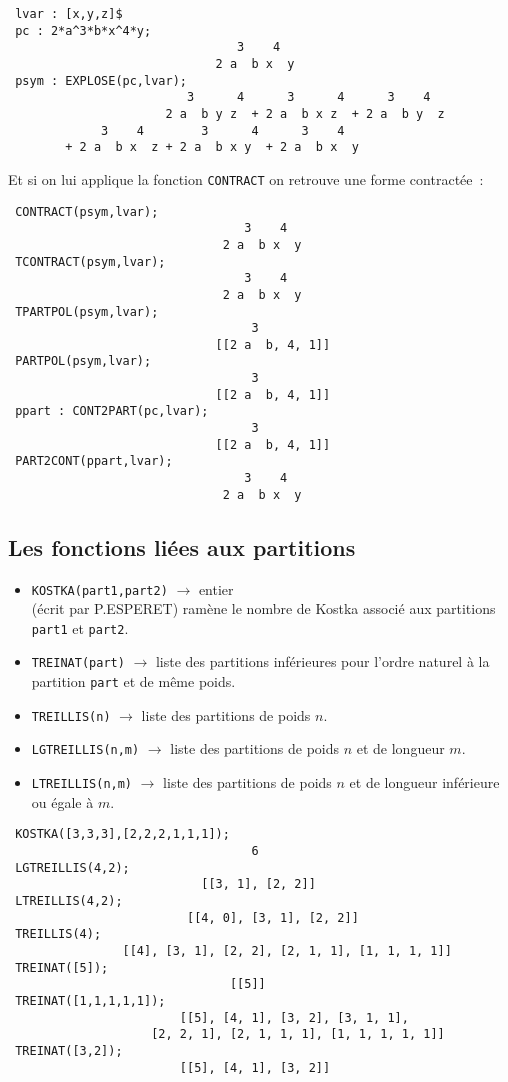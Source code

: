\small
\begin{verbatim}
 lvar : [x,y,z]$
 pc : 2*a^3*b*x^4*y;  
                                3    4
                             2 a  b x  y
 psym : EXPLOSE(pc,lvar);
                         3      4      3      4      3    4   
                      2 a  b y z  + 2 a  b x z  + 2 a  b y  z 
             3    4        3      4      3    4
        + 2 a  b x  z + 2 a  b x y  + 2 a  b x  y
\end{verbatim}
\normalsize
Et si on lui applique la fonction {\tt CONTRACT} on retrouve une forme 
contract\'ee~:
\small
\begin{verbatim}
 CONTRACT(psym,lvar);
                                 3    4
                              2 a  b x  y
 TCONTRACT(psym,lvar);
                                 3    4
                              2 a  b x  y
 TPARTPOL(psym,lvar);
                                  3
                             [[2 a  b, 4, 1]]
 PARTPOL(psym,lvar);
                                  3
                             [[2 a  b, 4, 1]]
 ppart : CONT2PART(pc,lvar);
                                  3
                             [[2 a  b, 4, 1]]
 PART2CONT(ppart,lvar);
                                 3    4
                              2 a  b x  y
\end{verbatim}
\normalsize

\subsection{Les fonctions li\'ees aux partitions}
\begin{itemize}
\item {\tt KOSTKA(part1,part2)} 
$\longrightarrow$ entier\\
 (\'ecrit par P.ESPERET) ram\`ene le
nombre de Kostka associ\'e aux partitions {\tt part1} et {\tt part2}.
\item {\tt TREINAT(part)}  
$\longrightarrow$ liste des partitions 
inf\'erieures pour l'ordre naturel
\`a la partition {\tt part} et de m\^eme poids.
\item{\tt TREILLIS(n)}  
$\longrightarrow$ liste des partitions de poids $n$.
\item {\tt LGTREILLIS(n,m)}  
$\longrightarrow$ 
liste des partitions de poids $n$ et
de longueur  $m$.
\item {\tt LTREILLIS(n,m)}  
$\longrightarrow$ 
liste des partitions de poids $n$ et
de longueur inf\'erieure ou \'egale \`a  $m$.
\end{itemize}
\small
\begin{verbatim}
 KOSTKA([3,3,3],[2,2,2,1,1,1]);
                                  6
 LGTREILLIS(4,2);
                           [[3, 1], [2, 2]]
 LTREILLIS(4,2);
                         [[4, 0], [3, 1], [2, 2]]
 TREILLIS(4);
                [[4], [3, 1], [2, 2], [2, 1, 1], [1, 1, 1, 1]]
 TREINAT([5]);
                               [[5]]
 TREINAT([1,1,1,1,1]);
                        [[5], [4, 1], [3, 2], [3, 1, 1],
                    [2, 2, 1], [2, 1, 1, 1], [1, 1, 1, 1, 1]]
 TREINAT([3,2]);
                        [[5], [4, 1], [3, 2]]
\end{verbatim}
\normalsize
